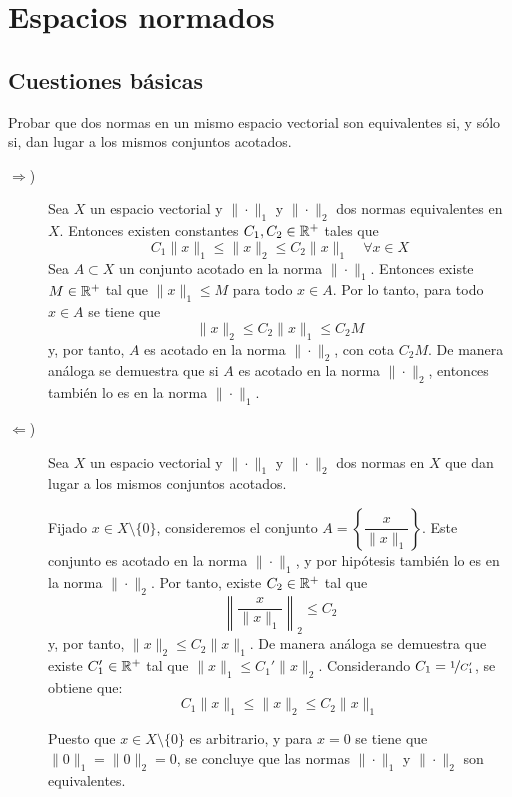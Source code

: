 \section{Espacios normados}

\subsection{Cuestiones básicas}

\begin{ejercicio}
Probar que dos normas en un mismo espacio vectorial son equivalentes si, y sólo si, dan lugar a los mismos conjuntos acotados.
\begin{description}
    \item[$\Longrightarrow$)] Sea $X$ un espacio vectorial y $\|\cdot\|_1$ y $\|\cdot\|_2$ dos normas equivalentes en $X$. Entonces existen constantes $C_1, C_2 \in \mathbb{R}^+$ tales que
    \[
    C_1 \|x\|_1 \leq \|x\|_2 \leq C_2 \|x\|_1 \quad \forall x \in X
    \]
    Sea $A \subset X$ un conjunto acotado en la norma $\|\cdot\|_1$. Entonces existe $M \in \mathbb{R}^+$ tal que $\|x\|_1 \leq M$ para todo $x \in A$. Por lo tanto, para todo $x \in A$ se tiene que
    \[
    \|x\|_2 \leq C_2 \|x\|_1 \leq C_2 M
    \]
    y, por tanto, $A$ es acotado en la norma $\|\cdot\|_2$, con cota $C_2 M$. De manera análoga se demuestra que si $A$ es acotado en la norma $\|\cdot\|_2$, entonces también lo es en la norma $\|\cdot\|_1$.

    \item[$\Longleftarrow$)] Sea $X$ un espacio vectorial y $\|\cdot\|_1$ y $\|\cdot\|_2$ dos normas en $X$ que dan lugar a los mismos conjuntos acotados.
    
    Fijado $x \in X \setminus \{0\}$, consideremos el conjunto $A = \left\{\dfrac{x}{\|x\|_1}\right\}$. Este conjunto es acotado en la norma $\|\cdot\|_1$, y por hipótesis también lo es en la norma $\|\cdot\|_2$. Por tanto, existe $C_2 \in \mathbb{R}^+$ tal que
    \[
    \left\|\frac{x}{\|x\|_1}\right\|_2 \leq C_2
    \]
    y, por tanto, $\|x\|_2 \leq C_2 \|x\|_1$. De manera análoga se demuestra que existe $C_1' \in \mathbb{R}^+$ tal que $\|x\|_1 \leq C_1' \|x\|_2$. Considerando $C_1 = \nicefrac{1}{C_1'}$, se obtiene que:
    \[
    C_1 \|x\|_1 \leq \|x\|_2 \leq C_2 \|x\|_1
    \]

    Puesto que $x \in X \setminus \{0\}$ es arbitrario, y para $x = 0$ se tiene que $\|0\|_1 = \|0\|_2 = 0$, se concluye que las normas $\|\cdot\|_1$ y $\|\cdot\|_2$ son equivalentes.
\end{description}
\end{ejercicio}

